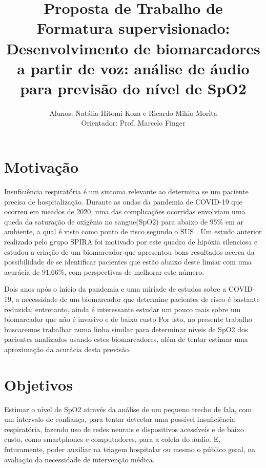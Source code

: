 \documentclass[12pt, a4paper]{article}
\begin{document}
\title{Proposta de Trabalho de Formatura supervisionado: \textbf{Desenvolvimento de biomarcadores a partir de voz: análise de áudio para previsão do nível de SpO2}}

\author{Alunos: Natália Hitomi Koza e Ricardo Mikio Morita \\ Orientador: Prof. Marcelo Finger}
\maketitle

\section{Motivação}
Insuficiência respiratória é um sintoma relevante ao determina se um paciente precisa de hospitalização. Durante as ondas da pandemia de COVID-19 que ocorreu em meados de 2020, uma das complicações ocorridas envolviam uma queda da saturação de oxigênio no sangue(SpO2) para abaixo de $95\%$ em ar ambiente, a qual é visto como ponto de risco segundo o SUS \cite{manualcovid}. Um estudo anterior realizado pelo grupo SPIRA foi motivado por este quadro de hipóxia silenciosa \citep{casanova2021deep} e estudou a criação de um biomarcador que apresentou bons resultados acerca da possibilidade de se identificar pacientes que estão abaixo deste limiar com uma acurácia de $91.66\%$, com perspectivas de melhorar este número. 

Dois anos após o início da pandemia e uma miríade de estudos sobre a COVID-19, a necessidade de um biomarcador que determine pacientes de risco é bastante reduzida; entretanto, ainda é interessante estudar um pouco mais sobre um biomarcador que não é invasivo e de baixo custo Por isto, no presente trabalho buscaremos trabalhar numa linha similar para determinar níveis de SpO2 dos pacientes analizados usando estes biomarcadores, além de tentar estimar uma aproximação da acurácia desta previsão.

\section{Objetivos}

Estimar o nível de SpO2 através da análise de um pequeno trecho de fala, com um intervalo de confiança, para tentar detectar uma possível insuficiência respiratória, fazendo uso de redes neurais e dispositivos acessíveis e de baixo custo, como smartphones e computadores, para a coleta do áudio. E, futuramente, poder auxiliar na triagem hospitalar ou mesmo o público geral, na avaliação da necessidade de intervenção médica.
\end{document}
